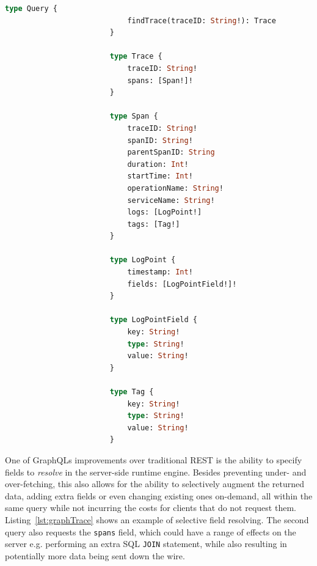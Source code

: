 \documentclass[12pt,pdftex,titlepage]{report}
\begin{document}
                    \begin{lstlisting}[caption={The base GraphQL schema, defining a query and data types for the trace data.}, language=GraphQL, gobble=24]
                        type Query {
                            findTrace(traceID: String!): Trace
                        }

                        type Trace {
                            traceID: String!
                            spans: [Span!]!
                        }

                        type Span {
                            traceID: String!
                            spanID: String!
                            parentSpanID: String
                            duration: Int!
                            startTime: Int!
                            operationName: String!
                            serviceName: String!
                            logs: [LogPoint!]
                            tags: [Tag!]
                        }

                        type LogPoint {
                            timestamp: Int!
                            fields: [LogPointField!]!
                        }

                        type LogPointField {
                            key: String!
                            type: String!
                            value: String!
                        }

                        type Tag {
                            key: String!
                            type: String!
                            value: String!
                        }
                    \end{lstlisting}
                    \bigskip
                    
                    One of GraphQLs improvements over traditional REST is the ability to specify fields to \textit{resolve} in the server-side runtime engine. Besides preventing
                    under- and over-fetching, this also allows for the ability to selectively augment the returned data, adding extra fields or even changing existing ones on-demand,
                    all within the same query while not incurring the costs for clients that do not request them. Listing~\ref{lst:graphTrace} shows an example of selective field
                    resolving. The second query also requests the \texttt{spans} field, which could have a range of effects on the server e.g. performing an extra SQL \texttt{JOIN}
                    statement, while also resulting in potentially more data being sent down the wire.
\end{document}

